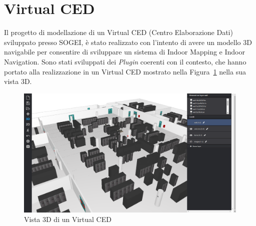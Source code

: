 \section{Virtual CED}
\label{sec:chapter_4_section_2}
Il progetto di modellazione di un Virtual CED (Centro Elaborazione Dati) sviluppato presso SOGEI, \`e stato realizzato con
l'intento di avere un modello 3D navigabile per consentire di sviluppare un sistema di Indoor Mapping e Indoor Navigation.
Sono stati sviluppati dei \emph{Plugin} coerenti con il contesto, che hanno portato alla realizzazione in un
Virtual CED mostrato nella Figura~\ref{fig:virtualCED} nella sua vista 3D.\\

\begin{figure}[htbp] %
   \centering
   \includegraphics[width=1\linewidth]{images/virtualCED}
   \caption{Vista 3D di un Virtual CED}
   \label{fig:virtualCED}
   \end{figure}

